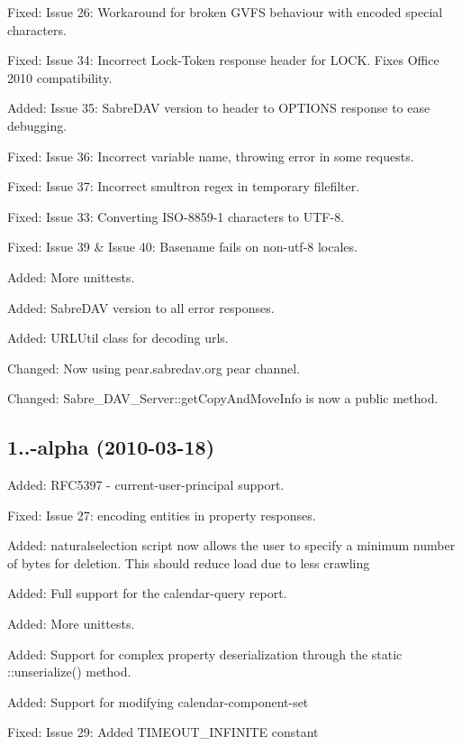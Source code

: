 \begin{DoxyItemize}
\item Fixed\+: Issue 26\+: Workaround for broken G\+V\+FS behaviour with encoded special characters.
\item Fixed\+: Issue 34\+: Incorrect Lock-\/\+Token response header for L\+O\+CK. Fixes Office 2010 compatibility.
\item Added\+: Issue 35\+: Sabre\+D\+AV version to header to O\+P\+T\+I\+O\+NS response to ease debugging.
\item Fixed\+: Issue 36\+: Incorrect variable name, throwing error in some requests.
\item Fixed\+: Issue 37\+: Incorrect smultron regex in temporary filefilter.
\item Fixed\+: Issue 33\+: Converting I\+S\+O-\/8859-\/1 characters to U\+T\+F-\/8.
\item Fixed\+: Issue 39 \& Issue 40\+: Basename fails on non-\/utf-\/8 locales.
\item Added\+: More unittests.
\item Added\+: Sabre\+D\+AV version to all error responses.
\item Added\+: U\+R\+L\+Util class for decoding urls.
\item Changed\+: Now using pear.\+sabredav.\+org pear channel.
\item Changed\+: Sabre\+\_\+\+D\+A\+V\+\_\+\+Server\+::get\+Copy\+And\+Move\+Info is now a public method.
\end{DoxyItemize}

\subsection*{1..-\/alpha (2010-\/03-\/18) }


\begin{DoxyItemize}
\item Added\+: R\+F\+C5397 -\/ current-\/user-\/principal support.
\item Fixed\+: Issue 27\+: encoding entities in property responses.
\item Added\+: naturalselection script now allows the user to specify a \textquotesingle{}minimum number of bytes\textquotesingle{} for deletion. This should reduce load due to less crawling
\item Added\+: Full support for the calendar-\/query report.
\item Added\+: More unittests.
\item Added\+: Support for complex property deserialization through the static \+::unserialize() method.
\item Added\+: Support for modifying calendar-\/component-\/set
\item Fixed\+: Issue 29\+: Added T\+I\+M\+E\+O\+U\+T\+\_\+\+I\+N\+F\+I\+N\+I\+TE constant
\end{DoxyItemize}

